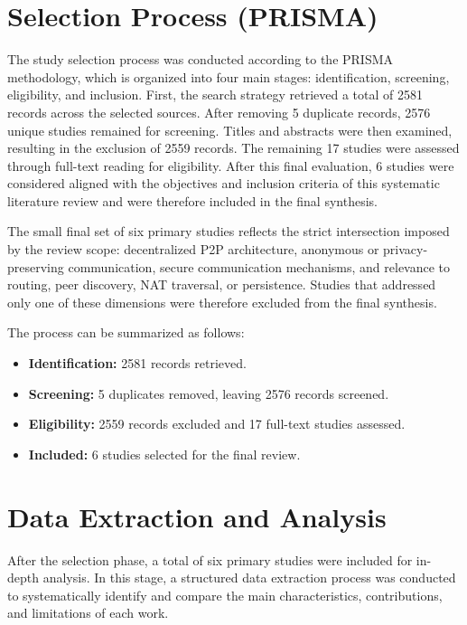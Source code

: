 \documentclass[12pt]{article}
\begin{document}
\section{Selection Process (PRISMA)}

\thesisprismatikz

The study selection process was conducted according to the PRISMA methodology, which is organized into four main stages: identification, screening, eligibility, and inclusion. First, the search strategy retrieved a total of 2581 records across the selected sources. After removing 5 duplicate records, 2576 unique studies remained for screening. Titles and abstracts were then examined, resulting in the exclusion of 2559 records. The remaining 17 studies were assessed through full-text reading for eligibility. After this final evaluation, 6 studies were considered aligned with the objectives and inclusion criteria of this systematic literature review and were therefore included in the final synthesis.

The small final set of six primary studies reflects the strict intersection imposed by the review scope: decentralized P2P architecture, anonymous or privacy-preserving communication, secure communication mechanisms, and relevance to routing, peer discovery, NAT traversal, or persistence. Studies that addressed only one of these dimensions were therefore excluded from the final synthesis.

The process can be summarized as follows:

\begin{itemize}
    \item \textbf{Identification:} 2581 records retrieved.
    \item \textbf{Screening:} 5 duplicates removed, leaving 2576 records screened.
    \item \textbf{Eligibility:} 2559 records excluded and 17 full-text studies assessed.
    \item \textbf{Included:} 6 studies selected for the final review.
\end{itemize}



\section{Data Extraction and Analysis}

After the selection phase, a total of six primary studies were included for in-depth analysis. In this stage, a structured data extraction process was conducted to systematically identify and compare the main characteristics, contributions, and limitations of each work.
\end{document}
